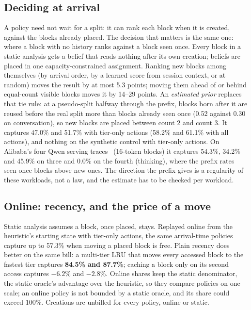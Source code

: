 \subsection{Deciding at arrival}
\label{sec:arrival}
A policy need not wait for a split: it can rank each block when it is created, against the blocks already
placed. The decision that matters is the same one: where a block with no history ranks against a block
seen once. Every block in a static analysis gets a belief that reads nothing after its own creation;
beliefs are placed in one capacity-constrained assignment. Ranking new blocks among themselves (by
arrival order, by a learned score from session context, or at random) moves the result by at most 5.3
points; moving them ahead of or behind equal-count visible blocks moves it by 14--29 points. An \emph{estimated
prior} replaces that tie rule: at a pseudo-split halfway through the prefix, blocks born after it are
reused before the real split more than blocks already seen once (0.52 against 0.30 on conversation), so
new blocks are placed between count 2 and count 3. It captures 47.0\% and 51.7\% with tier-only actions
(58.2\% and 61.1\% with all actions), and nothing on the synthetic control with tier-only actions. On Alibaba's four Qwen
serving traces~\cite{wang2025kvcachewild} (16-token blocks) it captures 54.3\%, 34.2\% and 45.9\% on three
and 0.0\% on the fourth (thinking), where the prefix rates seen-once blocks above new ones. The direction
the prefix gives is a regularity of these workloads, not a law, and the estimate has to be checked per
workload.

\subsection{Online: recency, and the price of a move}
\label{sec:online}
Static analysis assumes a block, once placed, stays. Replayed online from the heuristic's starting
state with tier-only actions, the same arrival-time policies capture up to 57.3\% when moving a placed block
is free. Plain recency does better on the same bill: a multi-tier LRU that moves every accessed block to the
fastest tier captures \textbf{84.5\% and 87.7\%}; caching a block only on its second access captures
$-6.2$\% and $-2.8$\%. Online shares keep the static denominator, the static oracle's advantage over the
heuristic, so they compare policies on one scale; an online policy is not bounded by a static oracle, and
its share could exceed 100\%. Creations are unbilled for every policy, online or static.

